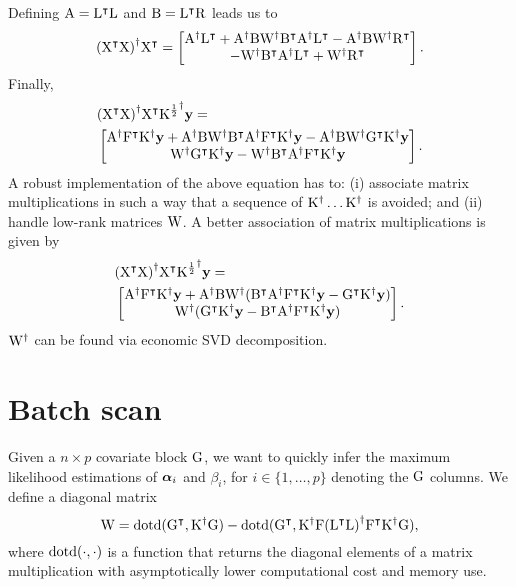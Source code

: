 \documentclass[twocolumn,draft]{article}
\begin{document}
Defining $\mathrm{A} = {\mathrm{L}}^\intercal\mathrm{L}$ and $\mathrm{B} = {\mathrm{L}}^\intercal\mathrm{R}$ leads us to
\begin{equation*}
	{({\mathrm{X}}^\intercal\mathrm{X})}^{\dagger}{\mathrm{X}}^\intercal =
		\begin{bmatrix}
			{\mathrm{A}}^{\dagger}{\mathrm{L}}^\intercal
			+ {\mathrm{A}}^{\dagger}\mathrm{B}{\mathrm{W}}^{\dagger}{\mathrm{B}}^\intercal{\mathrm{A}}^{\dagger}{\mathrm{L}}^\intercal
			-{\mathrm{A}}^{\dagger}\mathrm{B}{\mathrm{W}}^{\dagger}{\mathrm{R}}^\intercal\\
			-{\mathrm{W}}^{\dagger}{\mathrm{B}}^\intercal{\mathrm{A}}^{\dagger}{\mathrm{L}}^\intercal
			+ {\mathrm{W}}^{\dagger}{\mathrm{R}}^\intercal
		\end{bmatrix}.
\end{equation*}
Finally,
\begin{align*}
	&{({\mathrm{X}}^\intercal\mathrm{X})}^{\dagger}{\mathrm{X}}^\intercal {\mathrm{K}^{\frac{1}{2}}}^{\dagger}\mathbf{y} = \\
	&\begin{bmatrix}
		{\mathrm{A}}^{\dagger}{\mathrm{F}}^\intercal{\mathrm{K}}^{\dagger}\mathbf{y}
		+ {\mathrm{A}}^{\dagger}\mathrm{B}{\mathrm{W}}^{\dagger}{\mathrm{B}}^\intercal{\mathrm{A}}^{\dagger}{\mathrm{F}}^\intercal{\mathrm{K}}^{\dagger}\mathbf{y}
		-{\mathrm{A}}^{\dagger}\mathrm{B}{\mathrm{W}}^{\dagger}{\mathrm{G}}^\intercal{\mathrm{K}}^{\dagger}\mathbf{y} \\
		{\mathrm{W}}^{\dagger}{\mathrm{G}}^\intercal{\mathrm{K}}^{\dagger}\mathbf{y}
		-{\mathrm{W}}^{\dagger}{\mathrm{B}}^\intercal{\mathrm{A}}^{\dagger}{\mathrm{F}}^\intercal{\mathrm{K}}^{\dagger}\mathbf{y}
	\end{bmatrix}.
\end{align*}
A robust implementation of the above equation has to:
(i) associate matrix multiplications in such a way that a sequence of
${\mathrm{K}}^{\dagger}\dots{\mathrm{K}}^{\dagger}$ is avoided;
and (ii) handle low-rank matrices $\mathrm{W}$.
A better association of matrix multiplications is given by
\begin{align*}
	&{({\mathrm{X}}^\intercal\mathrm{X})}^{\dagger}{\mathrm{X}}^\intercal {\mathrm{K}^{\frac{1}{2}}}^{\dagger}\mathbf{y} = \\
	&\begin{bmatrix}
		{\mathrm{A}}^{\dagger}{\mathrm{F}}^\intercal{\mathrm{K}}^{\dagger}\mathbf{y}
		+ {\mathrm{A}}^{\dagger}\mathrm{B}{\mathrm{W}}^{\dagger}({\mathrm{B}}^\intercal{\mathrm{A}}^{\dagger}{\mathrm{F}}^\intercal{\mathrm{K}}^{\dagger}
		\mathbf{y}-{\mathrm{G}}^\intercal{\mathrm{K}}^{\dagger}\mathbf{y}) \\
		{\mathrm{W}}^{\dagger}({\mathrm{G}}^\intercal{\mathrm{K}}^{\dagger}\mathbf{y}
		-{\mathrm{B}}^\intercal{\mathrm{A}}^{\dagger}{\mathrm{F}}^\intercal{\mathrm{K}}^{\dagger}\mathbf{y})
	\end{bmatrix}.
\end{align*}
${\mathrm{W}}^{\dagger}$ can be found via economic SVD decomposition.

\section{Batch scan}

Given a $n\times p$ covariate block $\mathrm{G}$, we want to quickly infer the
maximum likelihood estimations of $\boldsymbol{\alpha}_i$ and $\beta_i$, for
$i \in \{1, \dots, p\}$ denoting the $\mathrm{G}$ columns.
We define a diagonal matrix
\begin{equation*}
	\mathrm{W} = \mathrm{dotd} ({\mathrm{G}}^\intercal, {\mathrm{K}}^{\dagger}\mathrm{G}) -
	       \mathrm{dotd} ({\mathrm{G}}^\intercal, {\mathrm{K}}^{\dagger}\mathrm{F}
				 {({\mathrm{L}}^\intercal\mathrm{L})}^{\dagger}{\mathrm{F}}^\intercal{\mathrm{K}}^{\dagger}\mathrm{G}),
\end{equation*}
where $\mathrm{dotd} (\cdot, \cdot)$ is a function that returns the diagonal elements
of a matrix multiplication with asymptotically lower computational cost and
memory use.
\end{document}
